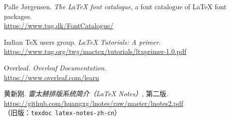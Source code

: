 \begin{thebibliography}{20}
 Palle J{\o}rgensen.
  \newblock \emph{The \LaTeX{} font catalogue}, a font catalogue of \LaTeX{} font packages.\\
  \url{https://www.tug.dk/FontCatalogue/}

 Indian \TeX{} users group.
  \newblock \emph{\LaTeX{} Tutorials: A primer}. \\
  \url{https://www.tug.org/twg/mactex/tutorials/ltxprimer-1.0.pdf}

 Overleaf.
  \newblock \emph{Overleaf Documentation}. \\
  \url{https://www.overleaf.com/learn}

 黄新刚.
  \newblock \emph{雷太赫排版系统简介（\LaTeX{} Notes）}, 第二版. \\
  \url{https://github.com/huangxg/lnotes/raw/master/lnotes2.pdf} \\
  （旧版：\texttt{texdoc latex-notes-zh-cn}）

\end{thebibliography}

\endinput
